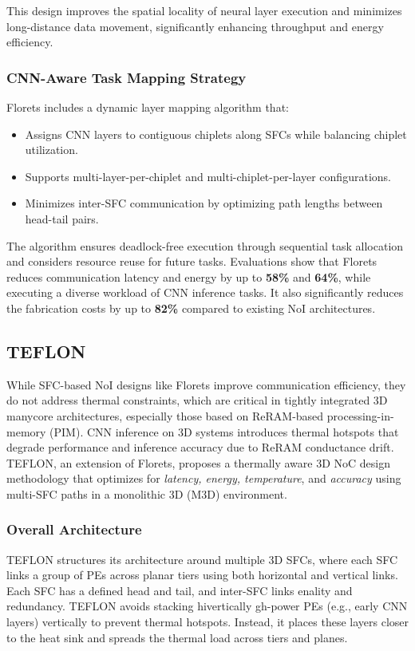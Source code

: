 \documentclass[acmsmall]{acmart}
\begin{document}
This design improves the spatial locality of neural layer execution and minimizes long-distance data movement, significantly enhancing throughput and energy efficiency.

\subsubsection{CNN-Aware Task Mapping Strategy}
Florets includes a dynamic layer mapping algorithm that:
\begin{itemize}
    \item Assigns CNN layers to contiguous chiplets along SFCs while balancing chiplet utilization.
    \item Supports multi-layer-per-chiplet and multi-chiplet-per-layer configurations.
    \item Minimizes inter-SFC communication by optimizing path lengths between head-tail pairs.
\end{itemize}

The algorithm ensures deadlock-free execution through sequential task allocation and considers resource reuse for future tasks. Evaluations show that Florets reduces communication latency and energy by up to \textbf{58\%} and \textbf{64\%}, while executing a diverse workload of CNN inference tasks. It also significantly reduces the fabrication costs by up to \textbf{82\%} compared to existing NoI architectures.


\subsection{TEFLON}
While SFC-based NoI designs like Florets improve communication efficiency, they do not address thermal constraints, which are critical in tightly integrated 3D manycore architectures, especially those based on ReRAM-based processing-in-memory (PIM). CNN inference on 3D systems introduces thermal hotspots that degrade performance and inference accuracy due to ReRAM conductance drift. TEFLON, an extension of Florets, proposes a thermally aware 3D NoC design methodology that optimizes for \textit{latency, energy, temperature}, and \textit{accuracy} using multi-SFC paths in a monolithic 3D (M3D) environment.

\subsubsection{Overall Architecture}
TEFLON structures its architecture around multiple 3D SFCs, where each SFC links a group of PEs across planar tiers using both horizontal and vertical links. Each SFC has a defined head and tail, and inter-SFC links enality and redundancy. TEFLON avoids stacking hivertically gh-power PEs (e.g., early CNN layers) vertically to prevent thermal hotspots. Instead, it places these layers closer to the heat sink and spreads the thermal load across tiers and planes.
\end{document}
